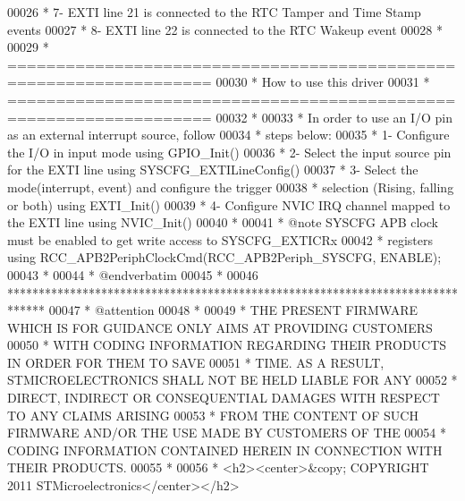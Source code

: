 \begin{DoxyCode}
00026 \textcolor{comment}{  *            7- EXTI line 21 is connected to the RTC Tamper and Time Stamp events                   
                                  }
00027 \textcolor{comment}{  *            8- EXTI line 22 is connected to the RTC Wakeup event}
00028 \textcolor{comment}{  *        }
00029 \textcolor{comment}{  *          ===================================================================}
00030 \textcolor{comment}{  *                                 How to use this driver}
00031 \textcolor{comment}{  *          ===================================================================  }
00032 \textcolor{comment}{  *              }
00033 \textcolor{comment}{  *          In order to use an I/O pin as an external interrupt source, follow}
00034 \textcolor{comment}{  *          steps below:}
00035 \textcolor{comment}{  *            1- Configure the I/O in input mode using GPIO\_Init()}
00036 \textcolor{comment}{  *            2- Select the input source pin for the EXTI line using SYSCFG\_EXTILineConfig()}
00037 \textcolor{comment}{  *            3- Select the mode(interrupt, event) and configure the trigger }
00038 \textcolor{comment}{  *               selection (Rising, falling or both) using EXTI\_Init()}
00039 \textcolor{comment}{  *            4- Configure NVIC IRQ channel mapped to the EXTI line using NVIC\_Init()}
00040 \textcolor{comment}{  *   }
00041 \textcolor{comment}{  *  @note  SYSCFG APB clock must be enabled to get write access to SYSCFG\_EXTICRx}
00042 \textcolor{comment}{  *         registers using RCC\_APB2PeriphClockCmd(RCC\_APB2Periph\_SYSCFG, ENABLE);}
00043 \textcolor{comment}{  *          }
00044 \textcolor{comment}{  *  @endverbatim                  }
00045 \textcolor{comment}{  *}
00046 \textcolor{comment}{  ******************************************************************************}
00047 \textcolor{comment}{  * @attention}
00048 \textcolor{comment}{  *}
00049 \textcolor{comment}{  * THE PRESENT FIRMWARE WHICH IS FOR GUIDANCE ONLY AIMS AT PROVIDING CUSTOMERS}
00050 \textcolor{comment}{  * WITH CODING INFORMATION REGARDING THEIR PRODUCTS IN ORDER FOR THEM TO SAVE}
00051 \textcolor{comment}{  * TIME. AS A RESULT, STMICROELECTRONICS SHALL NOT BE HELD LIABLE FOR ANY}
00052 \textcolor{comment}{  * DIRECT, INDIRECT OR CONSEQUENTIAL DAMAGES WITH RESPECT TO ANY CLAIMS ARISING}
00053 \textcolor{comment}{  * FROM THE CONTENT OF SUCH FIRMWARE AND/OR THE USE MADE BY CUSTOMERS OF THE}
00054 \textcolor{comment}{  * CODING INFORMATION CONTAINED HEREIN IN CONNECTION WITH THEIR PRODUCTS.}
00055 \textcolor{comment}{  *}
00056 \textcolor{comment}{  * <h2><center>&copy; COPYRIGHT 2011 STMicroelectronics</center></h2>}

\end{DoxyCode}
